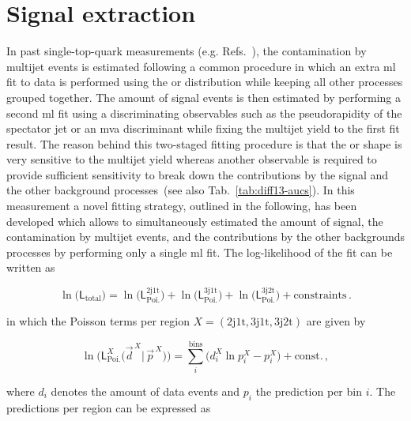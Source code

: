 \section{Signal extraction}
\label{sec:diff13-fit}

In past single-top-quark measurements (e.g. Refs.~\cite{Khachatryan:2015dzz,Khachatryan:2014iya,Sirunyan:2016cdg}), the contamination by multijet events is estimated following a common procedure in which an extra \gls{ml} fit to data is performed using the \mtw or \met distribution while keeping all other processes grouped together. The amount of signal events is then estimated by performing a second \gls{ml} fit using a discriminating observables such as the pseudorapidity of the spectator jet or an \gls{mva} discriminant while fixing the multijet yield to the first fit result. The reason behind this two-staged fitting procedure is that the \mtw or \met shape is very sensitive to the multijet yield whereas another observable is required to provide sufficient sensitivity to break down the contributions by the signal and the other background processes~(see also Tab.~\ref{tab:diff13-aucs}). In this measurement a novel fitting strategy, outlined in the following, has been developed which allows to simultaneously estimated the amount of signal, the contamination by multijet events, and the contributions by the other backgrounds processes by performing only a single \gls{ml} fit. The log-likelihood of the fit can be written as

\begin{equation}
\ln\big(\mathsf{L}_\mathrm{total}\big)=\ln\big(\mathsf{L}^\mathrm{2j1t}_\mathrm{Poi.}\big)+\ln\big(\mathsf{L}_\mathrm{Poi.}^\mathrm{3j1t}\big)+\ln\big(\mathsf{L}_\mathrm{Poi.}^\mathrm{3j2t}\big)+\mathrm{constraints}\,.
\end{equation}

in which the Poisson terms per region $X=(\mathrm{2j1t, 3j1t, 3j2t})$ are given by

\begin{equation}
\ln\Big(\mathsf{L}^{X}_\mathrm{Poi.}\big(\vec{d}^{\,X}|\,\vec{p}^{\,X}\big)\Big)=\sum_{i}^\mathrm{bins}\Big(d_{i}^{X}\ln p_{i}^{X}-p_{i}^{X}\Big)+\mathrm{const.}\,,
\end{equation}

where $d_{i}$ denotes the amount of data events and $p_{i}$ the prediction per bin $i$. The predictions per region can be expressed as

